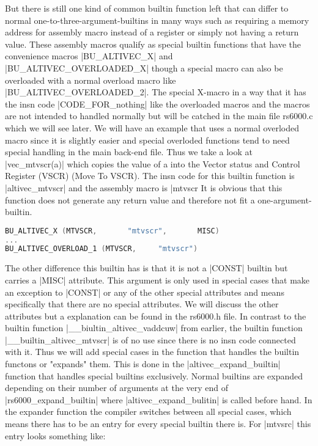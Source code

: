 But there is still one kind of common builtin function left that can differ to normal one-to-three-argument-builtins in many ways such as requiring a memory address for assembly macro instead of a register or simply not having a return value. These assembly macros qualify as special builtin functions that have the convenience macros |BU_ALTIVEC_X| and |BU_ALTIVEC_OVERLOADED_X| though a special macro can also be overloaded with a normal overload macro like |BU_ALTIVEC_OVERLOADED_2|.
The special X-macro in a way that it has the insn code |CODE_FOR_nothing| like the overloaded macros and the macros are not intended to handled normally but will be catched in the main file rs6000.c which we will see later.
We will have an example that uses a normal overloded macro since it is slightly easier and special overloded functions tend to need special handling in the main back-end file. Thus we take a look at |vec_mtvscr(a)| which copies the value of a into the Vector status and Control Register (VSCR) (Move To VSCR). The insn code for this builtin function is |altivec_mtvscr| and the assembly macro is |mtvscr %
It is obvious that this function does not generate any return value and therefore not fit a one-argument-builtin.
\begin{lstlisting}[language=C++,basicstyle=\ttfamily\scriptsize,keywordstyle=\color{red}] 
BU_ALTIVEC_X (MTVSCR,		"mtvscr",	    MISC)
...
BU_ALTIVEC_OVERLOAD_1 (MTVSCR,	   "mtvscr")
\end{lstlisting}
The other difference this builtin has is that it is not a |CONST| builtin but carries a |MISC| attribute. This argument is only used in special cases that make an exception to |CONST| or any of the other special attributes and means specifically that there are no special attributes. We will discuss the other attributes but a explanation can be found in the rs6000.h file.
In contrast to the builtin function |__biultin_altivec_vaddcuw| from earlier, the builtin function |__builtin_altivec_mtvscr| is of no use since there is no insn code connected with it. Thus we will add special cases in the function that handles the builtin functons or "expands" them. This is done in the |altivec_expand_builtin| function that handles special builtins exclusively. Normal builtins are expanded depending on their number of arguments at the very end of |rs6000_expand_builtin| where |altivec_expand_bulitin| is called before hand. 
In the expander function the compiler switches between all special cases, which means there has to be an entry for every special builtin there is. For |mtvsrc| this entry looks something like:
